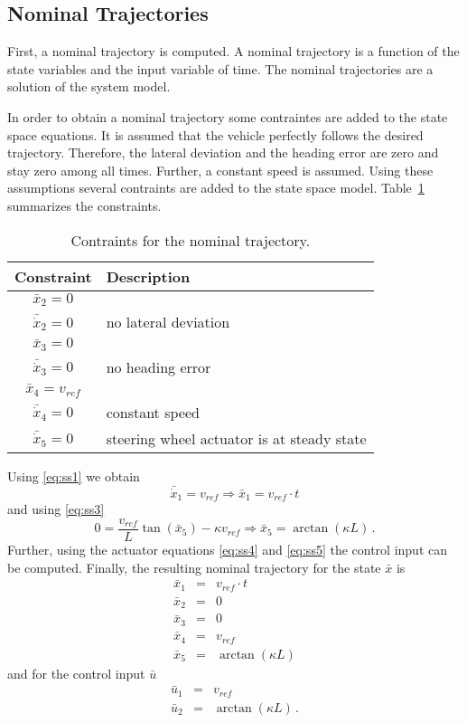 \documentclass{scrartcl}
\begin{document}
\subsection{Nominal Trajectories}
First, a nominal trajectory is computed.
A nominal trajectory is a function of the state variables and the input variable of time.
The nominal trajectories are a solution of the system model.

In order to obtain a nominal trajectory some contraintes are added to the state space equations.
It is assumed that the vehicle perfectly follows the desired trajectory.
Therefore, the lateral deviation and the heading error are zero and stay zero among all times.
Further, a constant speed is assumed.
Using these assumptions several contraints are added to the state space model.
Table~\ref{tab:nominal_contraints} summarizes the constraints.
\begin{table}[h]
	\centering
	\begin{tabular}{c|l}
	\hline
	\hline
	\textbf{Constraint} & \textbf{Description}\\
	\hline
	$\bar{x}_2 = 0$\\$\bar{\dot{x}}_2 = 0$ & no lateral deviation\\\hline
	$\bar{x}_3 = 0$\\$\bar{\dot{x}}_3 = 0$& no heading error\\\hline
	$\bar{x}_4 = v_{ref}$\\$\bar{\dot{x}}_4 = 0$& constant speed\\\hline
	$\bar{\dot{x}}_5 = 0$ & steering wheel actuator is at steady state\\
	\hline
	\end{tabular}
	\caption{Contraints for the nominal trajectory.}
	\label{tab:nominal_contraints}
\end{table}

\noindent Using \eqref{eq:ss1} we obtain
\begin{equation}
	\bar{\dot{x}}_1 = v_{ref} \Rightarrow \bar{x}_1 = v_{ref} \cdot t
\end{equation}
and using \eqref{eq:ss3}
\begin{equation}
	0 = \frac{v_{ref}}{L} \tan(\bar{x}_5) - \kappa v_{ref} \Rightarrow \bar{x}_5 = \arctan (\kappa L) \, .
\end{equation}
Further, using the actuator equations \eqref{eq:ss4} and \eqref{eq:ss5} the control input can be computed.
Finally, the resulting nominal trajectory for the state $\bar{x}$ is
\begin{eqnarray}
	\bar{x}_1 &=& v_{ref} \cdot t\\
	\bar{x}_2 &=& 0\\
	\bar{x}_3 &=& 0\\
	\bar{x}_4 &=& v_{ref}\\
	\bar{x}_5 &=& \arctan (\kappa L)
\end{eqnarray}
and for the control input $\bar{u}$
\begin{eqnarray}
	\bar{u}_1 &=& v_{ref}\\
	\bar{u}_2 &=& \arctan (\kappa L)\, .
\end{eqnarray}
\end{document}
